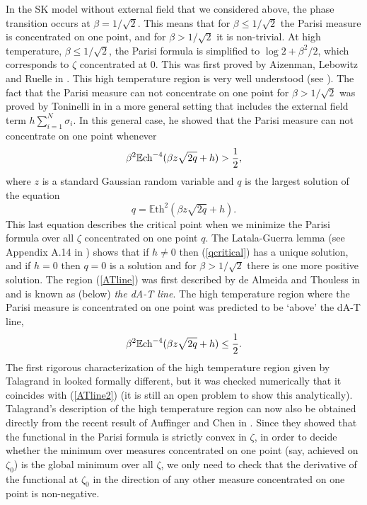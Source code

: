 \documentclass[12pt]{article}
\newcommand{\ch}{{\mbox{\rm ch}}}
\newcommand{\e}{\mathbb{E}}
\theoremstyle{nonumberplain}
\begin{document}
In the SK model without external field that we considered above, the phase transition occurs at $\beta = 1/\sqrt{2}$. This means that for $\beta\leq 1/\sqrt{2}$ the Parisi measure is concentrated on one point, and for $\beta>1/\sqrt{2}$ it is non-trivial. At high temperature, $\beta\leq 1/\sqrt{2}$, the Parisi formula is simplified to $\log 2 + \beta^2/2$, which corresponds to $\zeta$ concentrated at $0.$ This was first proved by Aizenman, Lebowitz and Ruelle in \cite{ALR}. This high temperature region is very well understood (see \cite{SG2, SG2-2}). The fact that the Parisi measure can not concentrate on one point for $\beta>1/\sqrt{2}$ was proved by Toninelli in \cite{TonAT} in a more general setting that includes the external field term $h\sum_{i=1}^N \sigma_i.$ In this general case, he showed that the Parisi measure can not concentrate on one point whenever
\begin{equation}
\beta^2 \e \ch^{-4}(\beta z \sqrt{2q} + h) > \frac{1}{2},
\label{ATline}
\end{equation}
where $z$ is a standard Gaussian random variable and $q$ is the largest solution of the equation
\begin{equation}
q = \e \mbox{th}^2 (\beta z \sqrt{2q} + h).
\label{qcritical}
\end{equation}
This last equation describes the critical point when we minimize the Parisi formula over all $\zeta$ concentrated on one point $q$. The Latala-Guerra lemma (see Appendix A.14 in \cite{SG2, SG2-2}) shows that if $h\not =0$ then (\ref{qcritical}) has a unique solution, and if $h=0$ then $q=0$ is a solution and for $\beta> 1/\sqrt{2}$ there is one more positive solution. The region (\ref{ATline}) was first described by de Almeida and Thouless in \cite{AT} and is known as (below) \emph{the dA-T line}. The high temperature region where the Parisi measure is concentrated on one point was predicted to be `above' the dA-T line,
\begin{equation}
\beta^2 \e \ch^{-4}(\beta z \sqrt{2q} + h) \leq \frac{1}{2}.
\label{ATline2}
\end{equation}
The first rigorous characterization of the high temperature region given by Talagrand in \cite{SG} looked formally different, but it was checked numerically that it coincides with (\ref{ATline2}) (it is still an open problem to show this analytically). Talagrand's description of the high temperature region can now also be obtained directly from the recent result of Auffinger and Chen in \cite{AufChen2}. Since they showed that the functional in the Parisi formula is strictly convex in $\zeta$, in order to decide whether the minimum over measures concentrated on one point (say, achieved on $\zeta_0$) is the global minimum over all $\zeta$, we only need to check that the derivative of the functional at $\zeta_0$ in the direction of any other measure concentrated on one point is non-negative. 
\end{document}

